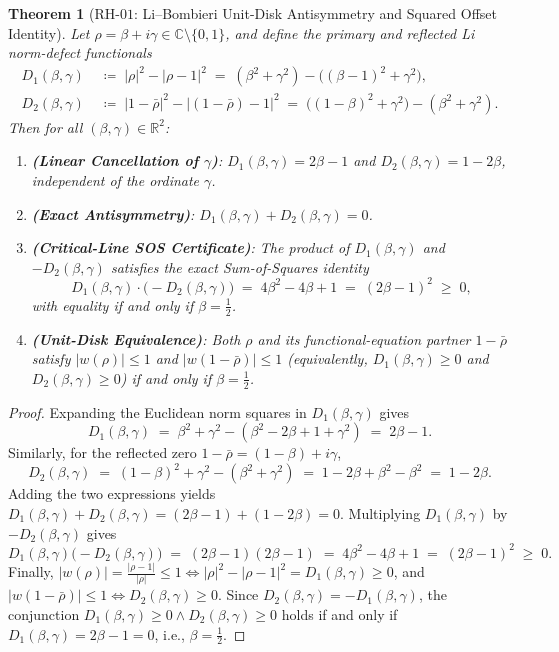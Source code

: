 \documentclass[11pt,a4paper]{article}
\theoremstyle{plain}
\newtheorem{theorem}{Theorem}[section]
\theoremstyle{definition}
\theoremstyle{remark}
\newcommand{\C}{\mathbb{C}}
\newcommand{\R}{\mathbb{R}}
\begin{document}
\begin{theorem}[$\mathrm{RH\text{-}01}$: Li--Bombieri Unit-Disk Antisymmetry and Squared Offset Identity]\label{thm:rh01}
Let $\rho = \beta + i\gamma \in \C \setminus \{0, 1\}$, and define the primary and reflected Li norm-defect functionals
\begin{align}
  D_1(\beta, \gamma) &\;\coloneqq\; |\rho|^2 - |\rho - 1|^2 \;=\; (\beta^2 + \gamma^2) - \bigl((\beta - 1)^2 + \gamma^2\bigr), \\
  D_2(\beta, \gamma) &\;\coloneqq\; |1 - \bar{\rho}|^2 - |(1 - \bar{\rho}) - 1|^2 \;=\; \bigl((1 - \beta)^2 + \gamma^2\bigr) - (\beta^2 + \gamma^2).
\end{align}
Then for all $(\beta, \gamma) \in \R^2$:
\begin{enumerate}
  \item \textbf{(Linear Cancellation of $\gamma$)}: $D_1(\beta, \gamma) = 2\beta - 1$ and $D_2(\beta, \gamma) = 1 - 2\beta$, independent of the ordinate $\gamma$.
  \item \textbf{(Exact Antisymmetry)}: $D_1(\beta, \gamma) + D_2(\beta, \gamma) = 0$.
  \item \textbf{(Critical-Line SOS Certificate)}: The product of $D_1(\beta, \gamma)$ and $-D_2(\beta, \gamma)$ satisfies the exact Sum-of-Squares identity
  \begin{equation}\label{eq:rh01-sos}
    D_1(\beta, \gamma)\cdot \bigl(-D_2(\beta, \gamma)\bigr) \;=\; 4\beta^2 - 4\beta + 1 \;=\; (2\beta - 1)^2 \;\ge\; 0,
  \end{equation}
  with equality if and only if $\beta = \frac{1}{2}$.
  \item \textbf{(Unit-Disk Equivalence)}: Both $\rho$ and its functional-equation partner $1 - \bar{\rho}$ satisfy $|w(\rho)| \le 1$ and $|w(1-\bar{\rho})| \le 1$ (equivalently, $D_1(\beta,\gamma) \ge 0$ and $D_2(\beta,\gamma) \ge 0$) if and only if $\beta = \frac{1}{2}$.
\end{enumerate}
\end{theorem}

\begin{proof}
Expanding the Euclidean norm squares in $D_1(\beta, \gamma)$ gives
\[
  D_1(\beta, \gamma) \;=\; \beta^2 + \gamma^2 - (\beta^2 - 2\beta + 1 + \gamma^2) \;=\; 2\beta - 1.
\]
Similarly, for the reflected zero $1 - \bar{\rho} = (1 - \beta) + i\gamma$,
\[
  D_2(\beta, \gamma) \;=\; (1 - \beta)^2 + \gamma^2 - (\beta^2 + \gamma^2) \;=\; 1 - 2\beta + \beta^2 - \beta^2 \;=\; 1 - 2\beta.
\]
Adding the two expressions yields $D_1(\beta, \gamma) + D_2(\beta, \gamma) = (2\beta - 1) + (1 - 2\beta) = 0$. Multiplying $D_1(\beta, \gamma)$ by $-D_2(\beta, \gamma)$ gives
\[
  D_1(\beta, \gamma)\bigl(-D_2(\beta, \gamma)\bigr) \;=\; (2\beta - 1)(2\beta - 1) \;=\; 4\beta^2 - 4\beta + 1 \;=\; (2\beta - 1)^2 \;\ge\; 0.
\]
Finally, $|w(\rho)| = \frac{|\rho - 1|}{|\rho|} \le 1 \iff |\rho|^2 - |\rho - 1|^2 = D_1(\beta, \gamma) \ge 0$, and $|w(1-\bar{\rho})| \le 1 \iff D_2(\beta, \gamma) \ge 0$. Since $D_2(\beta, \gamma) = -D_1(\beta, \gamma)$, the conjunction $D_1(\beta, \gamma) \ge 0 \land D_2(\beta, \gamma) \ge 0$ holds if and only if $D_1(\beta, \gamma) = 2\beta - 1 = 0$, i.e., $\beta = \frac{1}{2}$.
\end{proof}
\end{document}

